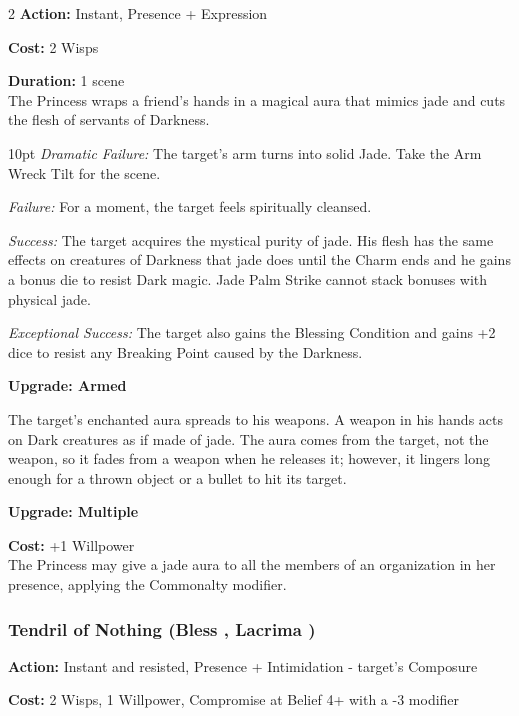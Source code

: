 \begin{multicols}{2}
\noindent \textbf{Action:} Instant, Presence + Expression

\noindent \textbf{Cost:} 2 Wisps

\noindent \textbf{Duration:} 1 scene \\

The Princess wraps a friend's hands in a magical aura that mimics jade and cuts the flesh of servants of Darkness.

\begin{myindentpar}{10pt}    \emph{Dramatic Failure:} The target's arm turns into solid Jade. Take the Arm Wreck Tilt for the scene. 

    \emph{Failure:} For a moment, the target feels spiritually cleansed.

    \emph{Success:} The target acquires the mystical purity of jade. His flesh has the same effects on creatures of Darkness that jade does until the Charm ends and he gains a bonus die to resist Dark magic. Jade Palm Strike cannot stack bonuses with physical jade. 
    
    \emph{Exceptional Success:} The target also gains the Blessing Condition and gains +2 dice to resist any Breaking Point caused by the Darkness. 

\textbf{Upgrade: Armed}

The target's enchanted aura spreads to his weapons. A weapon in his hands acts on Dark creatures as if made of jade. The aura comes from the target, not the weapon, so it fades from a weapon when he releases it; however, it lingers long enough for a thrown object or a bullet to hit its target.

\textbf{Upgrade: Multiple}

\textbf{Cost:} +1 Willpower \\

The Princess may give a jade aura to all the members of an organization in her presence, applying the Commonalty modifier.\end{myindentpar}


\subsubsection*{Tendril of Nothing (Bless \textbullet\textbullet\textbullet\textbullet, Lacrima \textbullet\textbullet\textbullet)}

\noindent \textbf{Action:} Instant and resisted, Presence + Intimidation - target's Composure

\noindent \textbf{Cost:} 2 Wisps, 1 Willpower, Compromise at Belief 4+ with a -3 modifier


\end{multicols}
